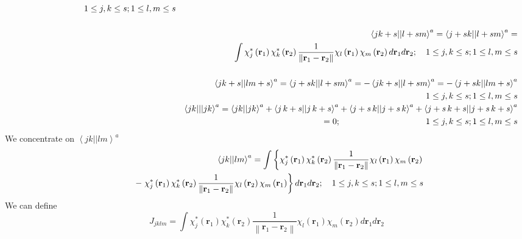 \documentclass[aps,preprint]{revtex4}
\begin{document}
\begin{eqnarray}
\qquad \quad \qquad \qquad \quad 1\leq j,k\leq s;1\leq l,m\leq s \\
&&  \notag \\
&&\left\langle jk+s||l+sm\right\rangle ^{a}=\left\langle
j+sk||l+sm\right\rangle ^{a}=  \notag \\
&&\int \chi _{j}^{\ast }\left( \mathbf{r}_{1}\right) \chi _{k}^{\ast }\left( 
\mathbf{r}_{2}\right) \frac{1}{\left\| \mathbf{r}_{1}-\mathbf{r}_{2}\right\| 
}\chi _{l}\left( \mathbf{r}_{1}\right) \chi _{m}\left( \mathbf{r}_{2}\right)
d\mathbf{r}_{1}d\mathbf{r}_{2};\quad 1\leq j,k\leq s;1\leq l,m\leq s \\
&&  \notag \\
&&\left\langle jk+s||lm+s\right\rangle ^{a}=\left\langle
j+sk||l+sm\right\rangle ^{a}=-\left\langle jk+s||l+sm\right\rangle
^{a}=-\left\langle j+sk||lm+s\right\rangle ^{a}  \notag \\
&&\left. {}\right. \quad \qquad \qquad \quad \qquad \qquad \quad \quad
\qquad \quad \qquad \qquad \qquad \quad 1\leq j,k\leq s;1\leq l,m\leq s \\
&&\left\langle jk|||jk\right\rangle ^{a}=\left\langle jk||jk\right\rangle
^{a}+\left\langle j\,k+s||j\,k+s\right\rangle ^{a}+\left\langle
j+s\,k||j+s\,k\right\rangle ^{a}+\left\langle
j+s\,k+s||j+s\,k+s\right\rangle ^{a}  \notag \\
&&\left. {}\right. \quad \qquad \qquad \quad \qquad \qquad =0;\quad \qquad
\qquad \quad \qquad \qquad 1\leq j,k\leq s;1\leq l,m\leq s
\end{eqnarray}%
We concentrate on $\left\langle jk||lm\right\rangle ^{a}$ 
\begin{eqnarray}
&&\left\langle jk||lm\right\rangle ^{a}=\int \left\{ \chi _{j}^{\ast }\left( 
\mathbf{r}_{1}\right) \chi _{k}^{\ast }\left( \mathbf{r}_{2}\right) \frac{1}{%
\left\| \mathbf{r}_{1}-\mathbf{r}_{2}\right\| }\chi _{l}\left( \mathbf{r}%
_{1}\right) \chi _{m}\left( \mathbf{r}_{2}\right) \right.   \notag \\
&&\qquad -\left. \chi _{j}^{\ast }\left( \mathbf{r}_{1}\right) \chi
_{k}^{\ast }\left( \mathbf{r}_{2}\right) \frac{1}{\left\| \mathbf{r}_{1}-%
\mathbf{r}_{2}\right\| }\chi _{l}\left( \mathbf{r}_{2}\right) \chi
_{m}\left( \mathbf{r}_{1}\right) \right\} d\mathbf{r}_{1}d\mathbf{r}%
_{2};\quad 1\leq j,k\leq s;1\leq l,m\leq s
\end{eqnarray}%
We can define 
\begin{equation}
J_{jklm}=\int \chi _{j}^{\ast }\left( \mathbf{r}_{1}\right) \chi _{k}^{\ast
}\left( \mathbf{r}_{2}\right) \frac{1}{\left\| \mathbf{r}_{1}-\mathbf{r}%
_{2}\right\| }\chi _{l}\left( \mathbf{r}_{1}\right) \chi _{m}\left( \mathbf{r%
}_{2}\right) d\mathbf{r}_{1}d\mathbf{r}_{2}
\end{equation}%
\end{document}
